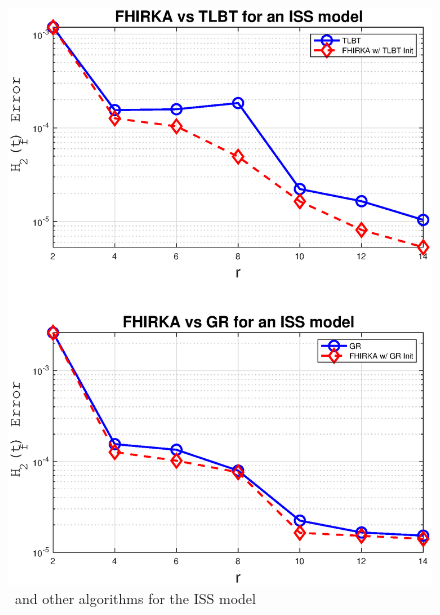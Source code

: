 \documentclass[twocolumn]{autart}
\begin{document}
 \begin{figure}[H]
 \centering
  \includegraphics [scale=0.35]{fig2i}
 \caption{\FH \ and other algorithms for the ISS model \label{fig:iss}}
 \end{figure}
\end{document}
